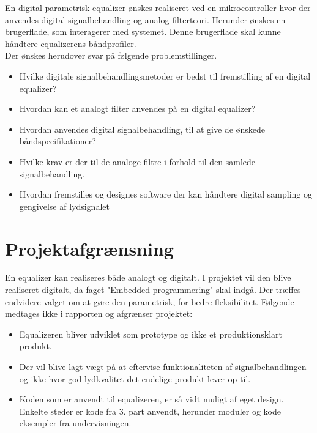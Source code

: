 En digital parametrisk equalizer ønskes realiseret ved en mikrocontroller hvor der anvendes digital signalbehandling og analog filterteori. 
Herunder ønskes en brugerflade, som interagerer med systemet. 
Denne brugerflade skal kunne håndtere equalizerens båndprofiler.\\

Der ønskes herudover svar på følgende problemstillinger.
\begin{itemize}[noitemsep]
	\item Hvilke digitale signalbehandlingsmetoder er bedst til fremstilling af en digital equalizer?
	\item Hvordan kan et analogt filter anvendes på en digital equalizer?
	\item Hvordan anvendes digital signalbehandling, til at give de ønskede båndspecifikationer?
	\item Hvilke krav er der til de analoge filtre i forhold til den samlede signalbehandling.
	\item Hvordan fremstilles og designes software der kan håndtere digital sampling og gengivelse af lydsignalet
\end{itemize}

\section{Projektafgrænsning}

En equalizer kan realiseres både analogt og digitalt.
I projektet vil den blive realiseret digitalt, da faget "Embedded programmering" skal indgå. 
Der træffes endvidere valget om at gøre den parametrisk, for bedre fleksibilitet. 
Følgende medtages ikke i rapporten og afgrænser projektet:
\begin{itemize}[noitemsep]
	\item Equalizeren bliver udviklet som prototype og ikke et produktionsklart produkt.
	\item Der vil blive lagt vægt på at eftervise funktionaliteten af signalbehandlingen og ikke hvor god lydkvalitet det endelige produkt lever op til.
	\item Koden som er anvendt til equalizeren, er så vidt muligt af eget design. Enkelte steder er kode fra 3. part anvendt, herunder moduler og kode eksempler fra undervisningen.
\end{itemize}


